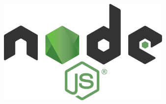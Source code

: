 \documentclass{beamer}
\begin{document}
\begin{frame}
\begin{columns}
\begin{column}{0.33\textwidth}
		\end{column}
			\begin{column}{0.33\textwidth}
			\begin{figure}
				\vspace{-10em}
				\centering
				\includegraphics[width=0.8\textwidth]{img/nodejs}
			\end{figure}
		\end{column}
	\end{columns}

	

\end{frame}
\end{document}
